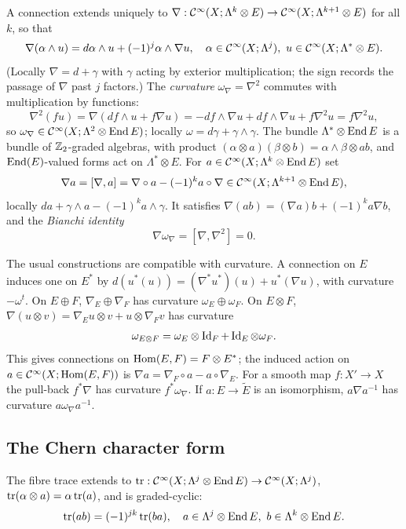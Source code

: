 A connection extends uniquely to $\nabla:\mathcal{C}^\infty(X;\Lambda^k\otimes E)\to
\mathcal{C}^\infty(X;\Lambda^{k+1}\otimes E)$ for all $k$, so that
\begin{equation*}
  \nabla(\alpha\wedge u)=d\alpha\wedge u+(-1)^j\alpha\wedge\nabla u,\quad
  \alpha\in\mathcal{C}^\infty(X;\Lambda^j),\ u\in\mathcal{C}^\infty(X;\Lambda^*\otimes E).
\end{equation*}
(Locally $\nabla=d+\gamma$ with $\gamma$ acting by exterior multiplication;
the sign records the passage of $\nabla$ past $j$ factors.) The \emph{curvature}
$\omega_\nabla=\nabla^2$ commutes with multiplication by functions:
\begin{equation*}
  \nabla^2(fu)=\nabla(df\wedge u+f\nabla u)=-df\wedge\nabla u+df\wedge\nabla
  u+f\nabla^2u=f\nabla^2u,
\end{equation*}
so $\omega_\nabla\in\mathcal{C}^\infty(X;\Lambda^2\otimes\operatorname{End} E)$; locally
$\omega=d\gamma+\gamma\wedge\gamma$. The bundle $\Lambda^*\otimes\operatorname{End} E$ is a
bundle of $\mathbb{Z}_2$-graded algebras, with product $(\alpha\otimes a)(\beta\otimes
b)=\alpha\wedge\beta\otimes ab$, and $\operatorname{End}(E)$-valued forms act on
$\Lambda^*\otimes E$. For $a\in\mathcal{C}^\infty(X;\Lambda^k\otimes\operatorname{End} E)$ set
\begin{equation*}
  \nabla a=[\nabla,a]=\nabla\circ a-(-1)^ka\circ\nabla
  \in\mathcal{C}^\infty(X;\Lambda^{k+1}\otimes\operatorname{End} E),
\end{equation*}
locally $da+\gamma\wedge a-(-1)^ka\wedge\gamma$. It satisfies
$\nabla(ab)=(\nabla a)b+(-1)^ka\nabla b$, and the \emph{Bianchi identity}
\begin{equation*}
  \nabla\omega_\nabla=[\nabla,\nabla^2]=0.
\end{equation*}

The usual constructions are compatible with curvature. A connection on $E$
induces one on $E^*$ by $d(u^*(u))=(\nabla^*u^*)(u)+u^*(\nabla u)$, with
curvature $-\omega^t$. On $E\oplus F$, $\nabla_E\oplus\nabla_F$ has curvature
$\omega_E\oplus\omega_F$. On $E\otimes F$, $\nabla(u\otimes v)=\nabla_Eu\otimes
v+u\otimes\nabla_Fv$ has curvature
\begin{equation*}
  \omega_{E\otimes F}=\omega_E\otimes\operatorname{Id}_F+\operatorname{Id}_E\otimes\omega_F.
\end{equation*}
This gives connections on $\operatorname{Hom}(E,F)=F\otimes E^*$; the induced action on
$a\in\mathcal{C}^\infty(X;\operatorname{Hom}(E,F))$ is $\nabla a=\nabla_F\circ a-a\circ\nabla_E$.
For a smooth map $f:X'\to X$ the pull-back $f^*\nabla$ has curvature
$f^*\omega_\nabla$. If $a:E\to\tilde E$ is an isomorphism, $a\nabla a^{-1}$ has
curvature $a\omega_\nabla a^{-1}$.

\subsection{The Chern character form}
The fibre trace extends to $\operatorname{tr}:\mathcal{C}^\infty(X;\Lambda^j\otimes\operatorname{End} E)\to\mathcal{C}^\infty(X;
\Lambda^j)$, $\operatorname{tr}(\alpha\otimes a)=\alpha\operatorname{tr}(a)$, and is graded-cyclic:
\begin{equation}\label{families:eq:graded-trace}
  \tr(ab)=(-1)^{jk}\tr(ba),\quad a\in\Lambda^j\otimes\End E,\ b\in\Lambda^k
  \otimes\End E.
\end{equation}


